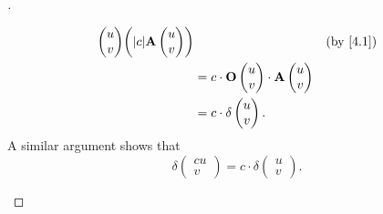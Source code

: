 \begin{proof}[]
\begin{enumerate}
\begin{align*}
{\begin{pmatrix}
                                                                          u \\
                                                                          v
                                                                        \end{pmatrix}} \pa{\abs{c} \mathbf{A}\begin{pmatrix}
                                                                                                               u \\
                                                                                                               v
                                                                                                             \end{pmatrix}} &  & \text{(by \cref{4.1})} \\
                                  & = c \cdot \mathbf{O}\begin{pmatrix}
                                                          u \\
                                                          v
                                                        \end{pmatrix} \cdot \mathbf{A}\begin{pmatrix}
                                                                                        u \\
                                                                                        v
                                                                                      \end{pmatrix}                                                  \\
                                  & = c \cdot \delta\begin{pmatrix}
                                                      u \\
                                                      v
                                                    \end{pmatrix}.
          \end{align*}
          A similar argument shows that
          \[
            \delta\begin{pmatrix}
              cu \\
              v
            \end{pmatrix} = c \cdot \delta\begin{pmatrix}
              u \\
              v
            \end{pmatrix}.
          \]


\end{enumerate}
\end{proof}
